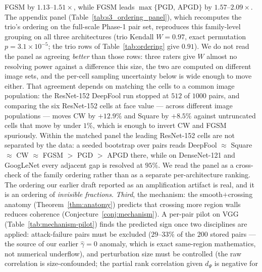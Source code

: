 FGSM by $1.13$--$1.51\times$, while FGSM leads $\max\{$PGD, APGD$\}$ by
$1.57$--$2.09\times$. The appendix panel
(Table~\ref{tab:s3_ordering_panel}), which recomputes the trio's ordering on
the full-scale Phase-1 pair set, reproduces this family-level grouping on
all three architectures (trio Kendall $W=0.97$, exact permutation
$p=3.1\times10^{-5}$; the trio rows of Table~\ref{tab:ordering} give $0.91$).
We do not read the panel as agreeing \emph{better} than those rows: three
raters give $W$ almost no resolving power against a difference this size, the
two are computed on different image sets, and the per-cell sampling
uncertainty below is wide enough to move either. That agreement depends on
matching the cells to a common image population: the ResNet-152 DeepFool run
stopped at $512$ of $1000$ pairs, and comparing the six ResNet-152 cells at
face value --- across different image populations --- moves CW by $+12.9\%$
and Square by $+8.5\%$ against untruncated cells that move by under $1\%$,
which is enough to invert CW and FGSM spuriously. Within the matched panel
the leading ResNet-152 cells are not separated by the data: a seeded
bootstrap over pairs reads DeepFool $\approx$ Square $\approx$ CW $\approx$
FGSM $>$ PGD $>$ APGD there, while on DenseNet-121 and GoogLeNet every
adjacent gap is resolved at $95\%$. We read the panel as a cross-check of
the family ordering rather than as a separate per-architecture ranking.
The ordering our earlier draft
reported as an amplification artifact is real, and it is an ordering of
\emph{invisible fractions}. \emph{Third}, the mechanism: the
smooth$+$crossing anatomy (Theorem~\ref{thm:anatomy}) predicts that
crossing more region walls reduces coherence
(Conjecture~\ref{conj:mechanism}). A per-pair pilot on VGG
(Table~\ref{tab:mechanism-pilot}) finds the predicted sign once two
disciplines are applied: attack-failure pairs must be excluded ($29$--$33\%$
of the $200$ stored pairs --- the source of our earlier $\widehat\gamma=0$ anomaly,
which is exact same-region mathematics, not numerical underflow), and
perturbation size must be controlled (the raw correlation is
size-confounded; the partial rank correlation given $d_\Psi$ is negative for
